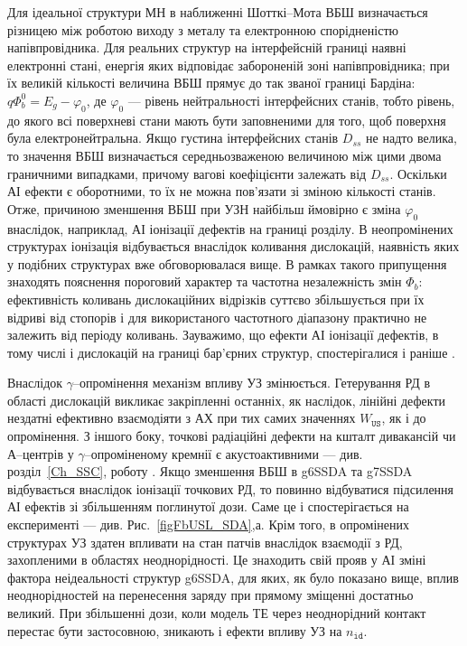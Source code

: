 Для ідеальної структури МН в наближенні Шотткі--Мота ВБШ визначається різницею між роботою виходу з металу та електронною спорідненістю напівпровідника.
Для реальних структур на інтерфейсній границі наявні електронні стані, енергія яких відповідає забороненій зоні напівпровідника;
при їх великій кількості величина ВБШ прямує до так званої границі Бардіна: $q\Phi_b^0=E_g-\varphi_0$,
де $\varphi_0$ --- рівень нейтральності інтерфейсних станів, тобто рівень, до якого всі поверхневі стани мають бути заповненими для того, щоб
поверхня була електронейтральна.
Якщо густина інтерфейсних станів $D_{ss}$ не надто велика, то значення ВБШ визначається середньозваженою величиною між цими двома
граничними випадками, причому вагові коефіцієнти залежать від $D_{ss}$.
Оскільки АІ ефекти є оборотними, то їх не можна пов'язати зі зміною кількості станів.
Отже, причиною зменшення ВБШ при УЗН найбільш ймовірно є зміна $\varphi_0$ внаслідок, наприклад, АІ іонізації дефектів на границі розділу.
В неопромінених структурах іонізація відбувається внаслідок коливання дислокацій, наявність яких у подібних структурах вже обговорювалася вище.
В рамках такого припущення знаходять пояснення пороговий характер та частотна незалежність змін $\Phi_b$:
ефективність коливань дислокаційних відрізків суттєво збільшується при їх відриві від стопорів і для використаного частотного діапазону
практично не залежить від періоду коливань.
Зауважимо, що ефекти АІ іонізації дефектів, в тому числі і дислокацій на границі бар'єрних структур, спостерігалися і раніше \cite{Olikh:FTP2011,Korotchenkov1995,OstrKorBook}.


Внаслідок $\gamma$--опромінення механізм впливу УЗ змінюється.
Гетерування РД в області дислокацій викликає закріпленні останніх, як наслідок, лінійні дефекти нездатні ефективно взаємодіяти з АХ при тих самих значеннях
$W_\mathtt{US}$, як і до опромінення.
З іншого боку, точкові радіаційні дефекти на кшталт дивакансій чи А--центрів у $\gamma$--опроміненому кремнії є акустоактивними --- див. розділ~\ref{Ch_SSC}, роботу \cite{YOlikh2006TPLr}.
Якщо зменшення ВБШ в g6SSDA та g7SSDA відбувається внаслідок іонізації точкових РД, то повинно відбуватися підсилення АІ ефектів зі збільшенням поглинутої дози.
Саме це і спостерігається на експерименті --- див. Рис.~\ref{figFbUSL_SDA},а.
Крім того, в опромінених структурах УЗ здатен впливати на стан патчів внаслідок взаємодії з РД, захопленими в областях неоднорідності.
Це знаходить свій прояв у АІ зміні фактора неідеальності структур g6SSDA, для яких, як було показано вище, вплив неоднорідностей на перенесення заряду при прямому зміщенні достатньо великий.
При збільшенні дози, коли модель ТЕ через неоднорідний контакт перестає бути застосовною, зникають і ефекти впливу УЗ на $n_\mathtt{id}$.


